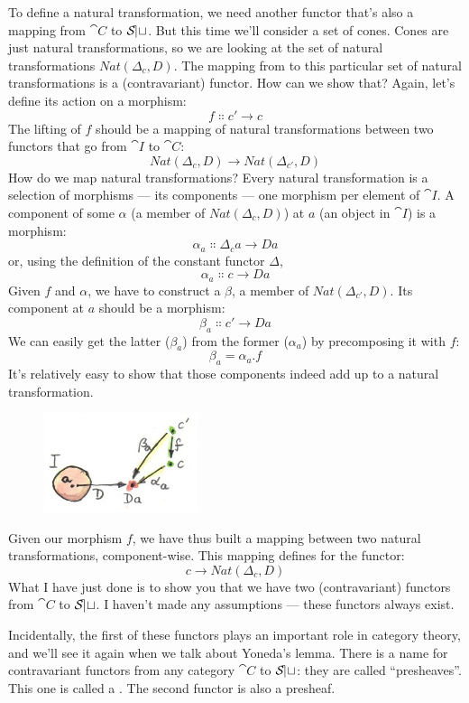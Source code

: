 \noindent
To define a natural transformation, we need another functor that's also
a mapping from $\cat{C}$ to $\mathcal{S\mkern-3mu et}$. But this time we'll consider a
set of cones. Cones are just natural transformations, so we are looking
at the set of natural transformations $Nat(\Delta_c, D)$. The mapping
from  to this particular set of natural transformations is a
(contravariant) functor. How can we show that? Again, let's define its
action on a morphism:
\[f \Colon c' \to c\]
The lifting of $f$ should be a mapping of natural transformations
between two functors that go from $\cat{I}$ to $\cat{C}$:
\[Nat(\Delta_c, D) \to Nat(\Delta_{c'}, D)\]
How do we map natural transformations? Every natural transformation is a
selection of morphisms --- its components --- one morphism per element
of $\cat{I}$. A component of some $\alpha$ (a member of $Nat(\Delta_c, D)$) at
$a$ (an object in $\cat{I}$) is a morphism:
\[\alpha_a \Colon \Delta_c a \to D a\]
or, using the definition of the constant functor $\Delta$,
\[\alpha_a \Colon c \to D a\]
Given $f$ and $\alpha$, we have to construct a $\beta$, a member of
$Nat(\Delta_{c'}, D)$. Its component at $a$ should be a
morphism:
\[\beta_a \Colon c' \to D a\]
We can easily get the latter ($\beta_a$) from the former ($\alpha_a$) by precomposing it with
$f$:
\[\beta_a = \alpha_a . f\]
It's relatively easy to show that those components indeed add up to a
natural transformation.

\begin{figure}[H]
\centering
\includegraphics[width=0.4\textwidth]{images/natmapping.jpg}
\end{figure}

\noindent
Given our morphism $f$, we have thus built a mapping between two
natural transformations, component-wise. This mapping defines
 for the functor:
\[c \to Nat(\Delta_c, D)\]
What I have just done is to show you that we have two (contravariant)
functors from $\cat{C}$ to $\mathcal{S\mkern-3mu et}$. I haven't made any assumptions
--- these functors always exist.

Incidentally, the first of these functors plays an important role in
category theory, and we'll see it again when we talk about Yoneda's
lemma. There is a name for contravariant functors from any category
$\cat{C}$ to $\mathcal{S\mkern-3mu et}$: they are called ``presheaves''. This one is
called a . The second functor is also a
presheaf.

